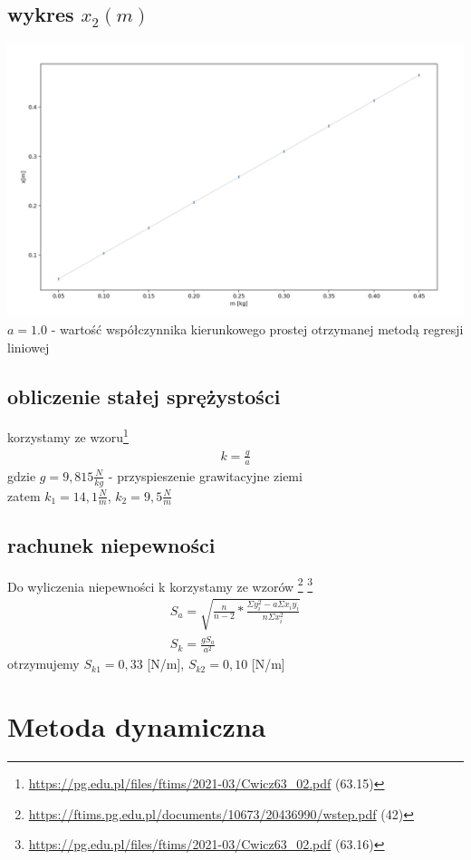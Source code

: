 \documentclass{article}
\begin{document}
\subsection{wykres $x_2(m)$}
\includegraphics[width=15cm]{m7_1_2}
$a = 1.0$ - wartość współczynnika kierunkowego prostej otrzymanej metodą regresji liniowej
\subsection{obliczenie stałej sprężystości}
korzystamy ze wzoru\footnote{\url{https://pg.edu.pl/files/ftims/2021-03/Cwicz63_02.pdf} (63.15)}
\begin{gather*}
	k = \frac{g}{a}
\end{gather*} 
gdzie $g = 9,815  \frac{N}{kg}$ - przyspieszenie grawitacyjne ziemi\\
zatem $k_1=14,1 \frac{N}{m}$, $k_2 = 9,5 \frac{N}{m}$

\subsection{rachunek niepewności}

Do wyliczenia niepewności k korzystamy ze wzorów \footnote{\url{https://ftims.pg.edu.pl/documents/10673/20436990/wstep.pdf} (42)} \footnote{\url{https://pg.edu.pl/files/ftims/2021-03/Cwicz63_02.pdf} (63.16)}
\begin{gather*}
S_a = \sqrt{\frac{n}{n-2} * \frac{\Sigma y_i^2 - a\Sigma x_iy_i}{n\Sigma x_i^2}} \\
S_k = \frac{gS_a}{a^2}
\end{gather*}
otrzymujemy $S_{k1} = 0,33$ [N/m],  $S_{k2} = 0,10$ [N/m]

\section{Metoda dynamiczna}
\end{document}
